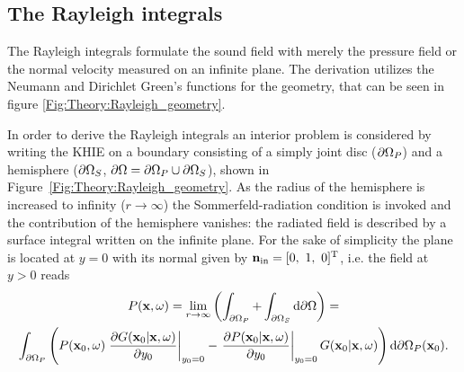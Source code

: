 
\subsection{The Rayleigh integrals}
\label{Section:Theory:Rayleigh}

The Rayleigh integrals formulate the sound field with merely the pressure field or the normal velocity measured on an infinite plane. The derivation utilizes the Neumann and Dirichlet Green's functions for the geometry, that can be seen in figure \ref{Fig:Theory:Rayleigh_geometry}.

In order to derive the Rayleigh integrals an interior problem is considered by writing the KHIE on a boundary consisting of a simply joint disc ($\partial \Omega_P$) and a hemisphere ($\partial \Omega_S$, $\partial \Omega = \partial \Omega_P \cup \partial \Omega_S$), shown in Figure\ \ref{Fig:Theory:Rayleigh_geometry}. As the radius of the hemisphere is increased to infinity ($r \rightarrow \infty$) the Sommerfeld-radiation condition is invoked and the contribution of the hemisphere vanishes: the radiated field is described by a surface integral written on the infinite plane. 
For the sake of simplicity the plane is located at $y=0$ with its normal given by $\vni = [0,\ 1,\ 0]^{\mathrm{T}}$, i.e. the field at $y>0$ reads
\begin{multline}
P(\mathbf{x},\omega) = \lim_{r\rightarrow \infty} \left( \int_{\partial \Omega_P} + \int_{\partial \Omega_S} \mathrm{d} \partial \Omega \right) = \\
\int_{\partial \Omega_P}  \left( 
P(\mathbf{x}_0,\omega)  
\left. \frac{\partial G(\mathbf{x}_0|\mathbf{x},\omega)}{\partial y_0} \right|_{y_0 = 0} 
-
\left. \frac{\partial P(\mathbf{x}_0|\mathbf{x},\omega)}{\partial y_0} \right|_{y_0 = 0} 
G(\mathbf{x}_0|\mathbf{x},\omega) 
\right)   \mathrm{d} \partial \Omega_P ( \mathbf{x}_0).
\end{multline}

